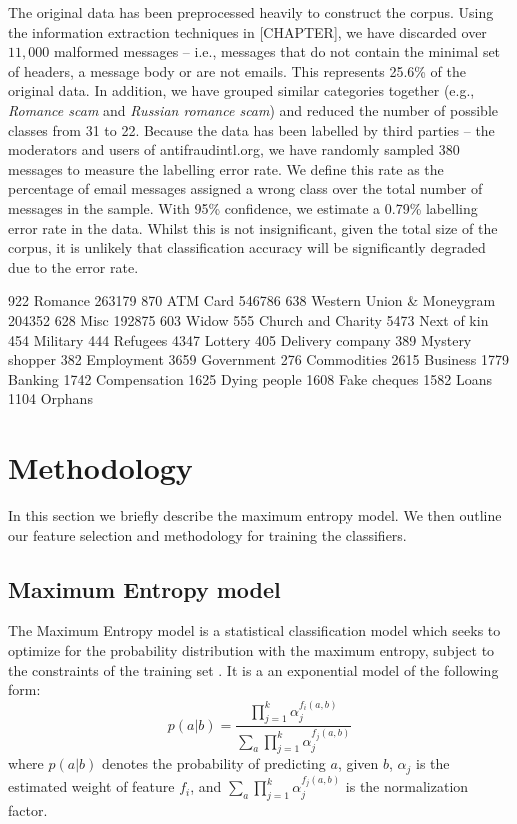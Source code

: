 The original data has been preprocessed heavily to construct the corpus. Using the information extraction techniques in [CHAPTER], we have discarded over $11,000$ malformed messages -- i.e., messages that do not contain the minimal set of headers, a message body or are not emails. This represents 25.6\% of the original data. In addition, we have grouped similar categories together (e.g., \textit{Romance scam} and \textit{Russian romance scam}) and reduced the number of possible classes from 31 to 22. Because the data has been labelled by third parties -- the moderators and users of antifraudintl.org, we have randomly sampled 380 messages to measure the labelling error rate. We define this rate as the percentage of email messages assigned a wrong class over the total number of messages in the sample. With 95\% confidence, we estimate a 0.79\% labelling error rate in the data. Whilst this is not insignificant, given the total size of the corpus, it is unlikely that classification accuracy will be significantly degraded due to the error rate. 


922		Romance						263179
870		ATM Card						546786
638		Western Union \& Moneygram	204352
628		Misc							192875
603		Widow
555		Church and Charity
5473	Next of kin
454		Military
444		Refugees
4347	Lottery
405		Delivery company
389		Mystery shopper
382		Employment
3659	Government
276		Commodities
2615	Business
1779	Banking
1742	Compensation
1625	Dying people
1608	Fake cheques
1582	Loans
1104	Orphans

\section{Methodology}
In this section we briefly describe the maximum entropy model. We then outline our feature selection and methodology for training the classifiers.
\subsection{Maximum Entropy model}
The Maximum Entropy model is a statistical classification model which seeks to optimize for the probability distribution with the maximum entropy, subject to the constraints of the training set . It is a an exponential model of the following form:
\begin{equation}
	p(a|b) = \frac{\prod_{j=1}^{k} \alpha_j^{f_i(a,b)}}{\sum_{a} \prod_{j=1}^{k} \alpha_j^{f_j(a,b)}}
\end{equation}
\noident where $p(a|b)$ denotes the probability of predicting $a$, given $b$, $\alpha_{j}$ is the estimated weight of feature $f_{i}$, and $\sum_{a} \prod_{j=1}^{k} \alpha_j^{f_j(a,b)}$ is the normalization factor. 

